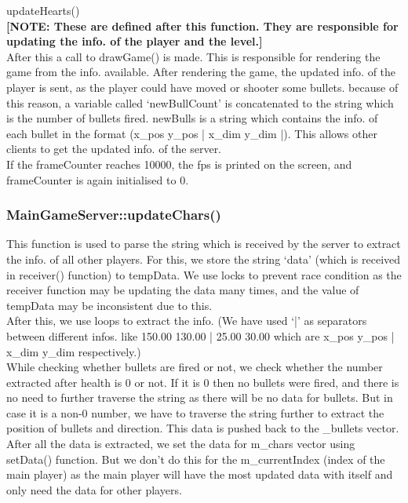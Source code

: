 \documentclass{article}
\begin{document}
updateHearts() \\

 \textbf{[NOTE: These are defined after this function. They are responsible for updating the info. of the player and the level.]} \\

After this a call to drawGame() is made. This is responsible for rendering the game from the info. available. After rendering the game, the updated info. of the player is sent, as the player could have moved or shooter some bullets. because of this reason, a variable called ‘newBullCount’ is concatenated to the string which is the number of bullets fired. newBulls is a string which contains the info. of each bullet in the format (x\_pos y\_pos | x\_dim y\_dim |). This allows other clients to get the updated info. of the server. \\

If the frameCounter reaches 10000, the fps is printed on the screen, and frameCounter is again initialised to 0. 
\newline

\subsubsection{MainGameServer::updateChars() }
This function is used to parse the string which is received by the server to extract the info. of all other players. For this, we store the string ‘data’ (which is received in receiver() function) to tempData. We use locks to prevent race condition as the receiver function may be updating the data many times, and the value of tempData may be inconsistent due to this. \\

After this, we use loops to extract the info. (We have used ‘|’ as separators between different infos. like 150.00 130.00 | 25.00 30.00 which are x\_pos y\_pos | x\_dim y\_dim respectively.) \\

While checking whether bullets are fired or not, we check whether the number extracted after health is 0 or not. If it is 0 then no bullets were fired, and there is no need to further traverse the string as there will be no data for bullets. But in case it is a non-0 number, we have to traverse the string further to extract the position of bullets and direction. This data is pushed back to the \_bullets vector. \\

After all the data is extracted, we set the data for m\_chars vector using setData() function. But we don’t do this for the m\_currentIndex (index of the main player) as the main player will have the most updated data with itself and only need the data for other players. \\
\newline
\end{document}
